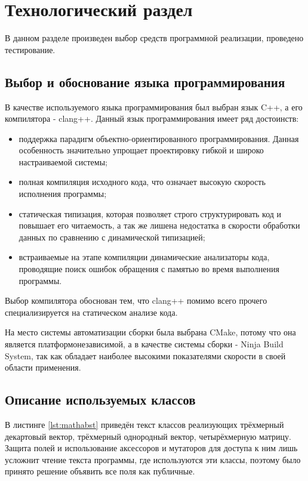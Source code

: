 \chapter{Технологический раздел}
\label{cha:impl}

В данном разделе произведен выбор средств программной реализации, проведено тестирование.

\section{Выбор и обоснование языка программирования}

В качестве используемого языка программирования был выбран язык C++, а его компилятора - clang++. Данный язык программирования имеет ряд достоинств:
\begin{itemize}
    \item поддержка парадигм объектно-ориентированного программирования. Данная особенность значительно упрощает проектировку гибкой и широко настраиваемой системы;
    \item полная компиляция исходного кода, что означает высокую скорость исполнения программы;
    \item статическая типизация, которая позволяет строго структурировать код и повышает его читаемость, а так же лишена недостатка в скорости обработки данных по сравнению с динамической типизацией;
    \item встраиваемые на этапе компиляции динамические анализаторы кода, проводящие поиск ошибок обращения с памятью во время выполнения программы.
\end{itemize}
Выбор компилятора обоснован тем, что clang++ помимо всего прочего специализируется на статическом анализе кода.

На место системы автоматизации сборки была выбрана CMake, потому что она является платформонезависимой, а в качестве системы сборки - Ninja Build System, так как обладает наиболее высокими показателями скорости в своей области применения.

\section{Описание используемых классов}

В листинге \ref{lst:mathabst} приведён текст классов реализующих трёхмерный декартовый вектор, трёхмерный однородный вектор, четырёхмерную матрицу. Защита полей и использование аксессоров и мутаторов для доступа к ним лишь усложнит чтение текста программы, где используются эти классы, поэтому было принято решение объявить все поля как публичные.


